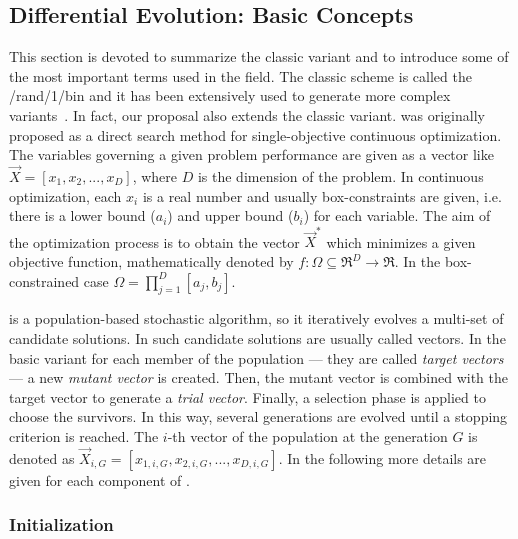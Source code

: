 \subsection{Differential Evolution: Basic Concepts}

This section is devoted to summarize the classic \DE{} variant and to introduce some of the most important terms used in the \DE{} field.
%
The classic \DE{} scheme is called the \DE{}/rand/1/bin and it has been extensively used to generate more complex \DE{} variants~\cite{das2011differential}.
%
In fact, our proposal also extends the classic variant.
%
%
\DE{} was originally proposed as a direct search method for single-objective continuous optimization.
%
The variables governing a given problem performance are given as a vector like $\vec{X} = [x_1, x_2, ..., x_D]$, where $D$ is the
dimension of the problem.
%
In continuous optimization, each $x_i$ is a real number and usually box-constraints are given, i.e. there is a lower bound ($a_{i}$) and
upper bound ($b_{i}$) for each variable.
%
The aim of the optimization process is to obtain the vector $\vec{X}^*$ which minimizes a given objective function, mathematically 
denoted by $f : \Omega \subseteq \Re^D \rightarrow \Re$.
%
In the box-constrained case $\Omega = {\prod}_{j=1}^{D} [a_{j}, b_{j}]$.

\DE{} is a population-based stochastic algorithm, so it iteratively evolves a multi-set of candidate solutions.
%
In \DE{} such candidate solutions are usually called vectors.
%
In the basic \DE{} variant for each member of the population --- they are called \textit{target vectors} --- a new \textit{mutant vector}
is created.
%
Then, the mutant vector is combined with the target vector to generate a \textit{trial vector}.
%
Finally, a selection phase is applied to choose the survivors.
%
In this way, several generations are evolved until a stopping criterion is reached.
%
The $i$-th vector of the population at the generation $G$ is denoted as $\vec{X}_{i,G} = [x_{1,i,G}, x_{2,i,G},..., x_{D,i, G}]$.
%
In the following more details are given for each component of \DE{}.


\subsubsection{Initialization}

